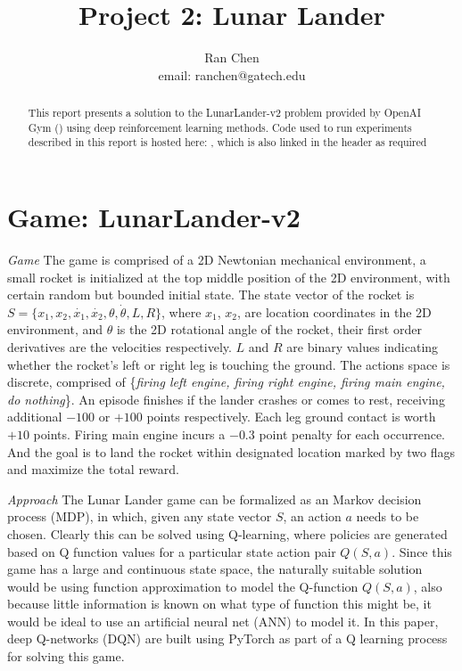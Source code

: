 \documentclass[10pt]{article}
\author{Ran Chen \\ email: ranchen@gatech.edu\vspace{-2ex}}
\title{\vspace{-1.8cm}Project 2: Lunar Lander}
\date{}
\begin{document}
\maketitle
\thispagestyle{fancy}


\begin{abstract}
This report presents a solution to the LunarLander-v2 problem provided by OpenAI Gym () using deep reinforcement learning methods. Code used to run experiments described in this report is hosted here: , which is also linked in the header as required
\end{abstract}

\section{Game: LunarLander-v2} \label{game}

\textit{Game} The game is comprised of a 2D Newtonian mechanical environment, a small rocket is initialized at the top middle position of the 2D environment, with certain random but bounded initial state. The state vector of the rocket is $S=\{x_1, x_2, \dot{x_1}, \dot{x_2}, \theta, \dot{\theta}, L, R\}$, where $x_1$, $x_2$, are location coordinates in the 2D environment, and $\theta$ is the 2D rotational angle of the rocket, their first order derivatives are the velocities respectively. $L$ and $R$ are binary values indicating whether the rocket's left or right leg is touching the ground. The actions space is discrete, comprised of \{\textit{firing left engine, firing right engine, firing main engine, do nothing}\}. An episode finishes if the lander crashes or comes to rest, receiving additional $-100$ or $+100$ points respectively. Each leg ground contact is worth $+10$ points. Firing main engine incurs a $-0.3$ point penalty for each occurrence. And the goal is to land the rocket within designated location marked by two flags and maximize the total reward.\par
\bigbreak
\noindent
\textit{Approach} The Lunar Lander game can be formalized as an Markov decision process (MDP), in which, given any state vector $S$, an action $a$ needs to be chosen. Clearly this can be solved using Q-learning, where policies are generated based on Q function values for a particular state action pair $Q(S,a)$. Since this game has a large and continuous state space, the naturally suitable solution would be using function approximation to model the Q-function $Q(S,a)$, also because little information is known on what type of function this might be, it would be ideal to use an artificial neural net (ANN) to model it. In this paper, deep Q-networks (DQN)\cite{MnihPlayingAtariDeep2013, RoderickImplementingDeepQNetwork2017} are built using PyTorch as part of a Q learning process for solving this game. 
\end{document}
